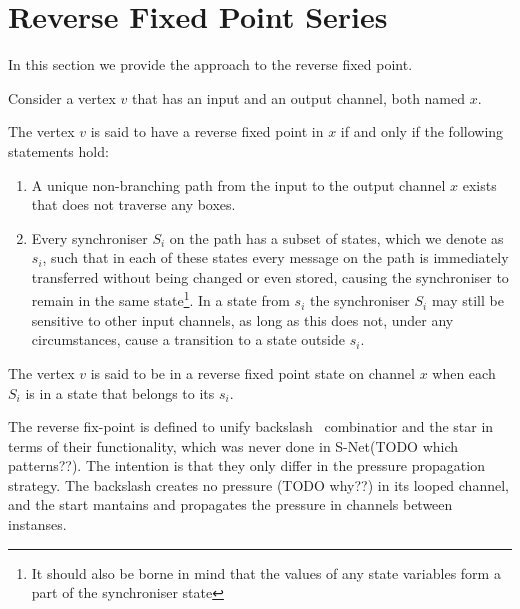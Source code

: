     \section{Reverse Fixed Point Series\label{rfp}}
In this section we provide the approach to the reverse fixed point.

Consider a vertex $v$ that has an input and an output channel, both named $x$.

\begin{definition} The vertex $v$ is said to have a reverse fixed point in $x$ if and only if the following statements hold:

\begin{enumerate}
\item A unique non-branching path from the input to the output channel $x$ exists that does not traverse any boxes.

\item Every synchroniser $S_i$ on the path has a subset of states, which we denote as $s_i$, such that in each of these states every message on the path is immediately transferred without being changed or even stored, causing the synchroniser to remain in the same state\footnote{It should also be borne in mind that the values of any state variables form a part of the synchroniser state}. In a state from $s_i$ the synchroniser $S_i$ may still be sensitive to other input channels, as long as this does not, under any circumstances, cause a transition to a state outside $s_i$.
\end{enumerate}
\end{definition}

The vertex $v$ is said to be in a reverse fixed point state on channel $x$ when each $S_i$ is in a state that belongs to its $s_i$.

The reverse fix-point is defined to unify backslash \ combinatior and the star in terms of their functionality, which was never done in S-Net(TODO which patterns??). The intention is that they only differ in the pressure propagation strategy. The backslash creates no pressure (TODO why??) in its looped channel, and the start mantains and propagates the pressure in channels between instanses.

%
%
%
%

